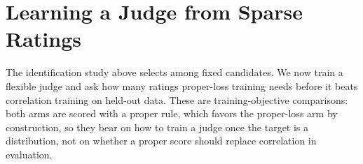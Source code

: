 \section{Learning a Judge from Sparse Ratings}
\label{sec:learning}
The identification study above selects among fixed candidates.
We now train a flexible judge and ask how many ratings proper-loss training needs before it beats correlation training on held-out data.
These are training-objective comparisons: both arms are scored with a proper rule, which favors the proper-loss arm by construction, so they bear on how to train a judge once the target is a distribution, not on whether a proper score should replace correlation in evaluation.

